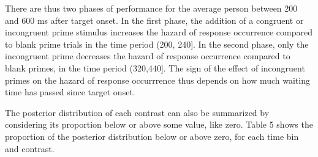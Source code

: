 \documentclass[
  man, donotrepeattitle,floatsintext]{apa6}
\begin{document}
There are thus two phases of performance for the average person between 200 and 600 ms after target onset. In the first phase, the addition of a congruent or incongruent prime stimulus increases the hazard of response occurrence compared to blank prime trials in the time period (200, 240{]}. In the second phase, only the incongruent prime decreases the hazard of response occurrence compared to blank primes, in the time period (320,440{]}. The sign of the effect of incongruent primes on the hazard of response occurrrence thus depends on how much waiting time has passed since target onset.

The posterior distribution of each contrast can also be summarized by considering its proportion below or above some value, like zero.
Table 5 shows the proportion of the posterior distribution below or above zero, for each time bin and contrast.
\end{document}
